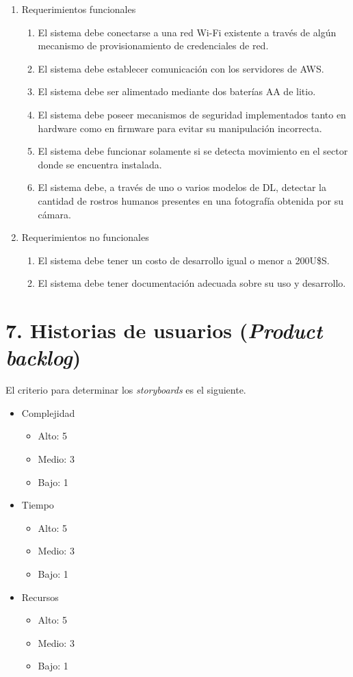 \documentclass[
11pt, %
]{plan}
\begin{document}
\begin{enumerate}
	\item Requerimientos funcionales
		\begin{enumerate}
			\item El sistema debe conectarse a una red Wi-Fi existente a través de algún mecanismo de provisionamiento de credenciales de red.
			\item El sistema debe establecer comunicación con los servidores de AWS.
			\item El sistema debe ser alimentado mediante dos baterías AA de litio.
			\item El sistema debe poseer mecanismos de seguridad implementados tanto en hardware como en firmware para evitar su manipulación incorrecta.
			\item El sistema debe funcionar solamente si se detecta movimiento en el sector donde se encuentra instalada.
			\item El sistema debe, a través de uno o varios modelos de DL, detectar la cantidad de rostros humanos presentes en una fotografía obtenida por su cámara.
		\end{enumerate}
	\item Requerimientos no funcionales
		\begin{enumerate}
			\item El sistema debe tener un costo de desarrollo igual o menor a 200U\$S.
			\item El sistema debe tener documentación adecuada sobre su uso y desarrollo.
		\end{enumerate}
\end{enumerate}

\section{7. Historias de usuarios (\textit{Product backlog})}
\label{sec:backlog}

El criterio para determinar los \textit{storyboards} es el siguiente.

\begin{itemize}
	\item Complejidad
	\begin{itemize}
		\item Alto: 5
		\item Medio: 3
		\item Bajo: 1
	\end{itemize}
	\item Tiempo
	\begin{itemize}
		\item Alto: 5
		\item Medio: 3
		\item Bajo: 1
	\end{itemize}
	\item Recursos
	\begin{itemize}
		\item Alto: 5
		\item Medio: 3
		\item Bajo: 1
	\end{itemize}
\end{itemize}
\end{document}
